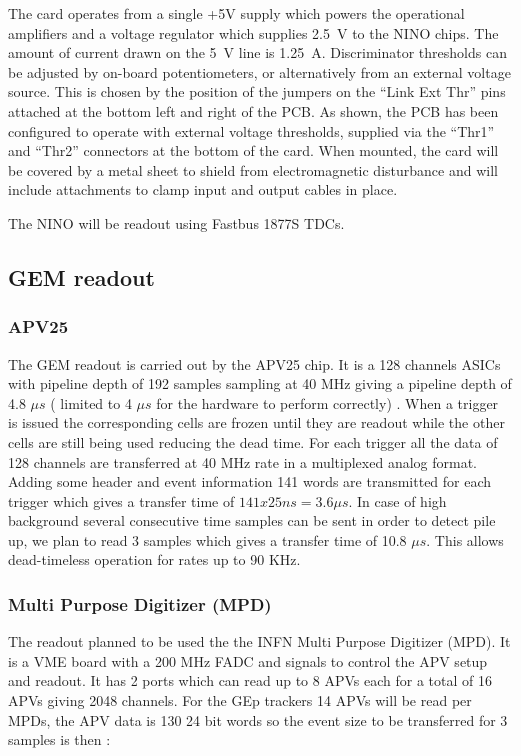 \documentclass{article}
\begin{document}
The card operates from a single +5V supply which powers the operational
amplifiers and a voltage regulator which supplies 2.5~V to the NINO
chips. The amount of current drawn on the 5~V line is 1.25~A. Discriminator
thresholds can be adjusted by on-board potentiometers, or alternatively
from an external voltage source. This is chosen by the position of
the jumpers on the ``Link Ext Thr'' pins attached at the bottom
left and right of the PCB. As shown, the PCB has been configured to
operate with external voltage thresholds, supplied via the ``Thr1''
and ``Thr2'' connectors at the bottom of the card. When mounted,
the card will be covered by a metal sheet to shield from electromagnetic
disturbance and will include attachments to clamp input and output
cables in place.

The NINO will be readout using Fastbus 1877S TDCs.

\subsection {GEM readout}
\subsubsection{APV25}
The GEM readout is carried out by the APV25 chip. It is a 128 channels ASICs with pipeline depth of 192 samples sampling at 40 MHz giving a pipeline depth of 4.8 $\mu s$ ( limited to 4 $\mu s$ for the hardware to perform correctly) . When a trigger is issued the corresponding cells are frozen until they are readout while the other cells are still being used reducing the dead time.
For each trigger all the data of 128 channels are transferred at 40 MHz rate in a multiplexed analog format. Adding some header and event information 141 words are transmitted for each trigger which gives a transfer time of $141x25 ns = 3.6 \mu s $. In case of high background several consecutive time samples can be sent in order to detect pile up, we plan to read 3 samples which gives a transfer time of 10.8 $\mu s$. This allows dead-timeless operation for rates up to 90 KHz.

\subsubsection {Multi Purpose Digitizer (MPD)}
 The readout planned to be used the the INFN Multi Purpose Digitizer (MPD). It is a VME board with a 200 MHz FADC and signals to control the APV setup and readout. It has 2 ports which can read up to 8 APVs each for a total of 16 APVs giving 2048 channels. 
For the GEp trackers 14 APVs will be read per MPDs, the APV data is 130 24 bit words so the event size to be transferred for 3 samples is then :
\end{document}
